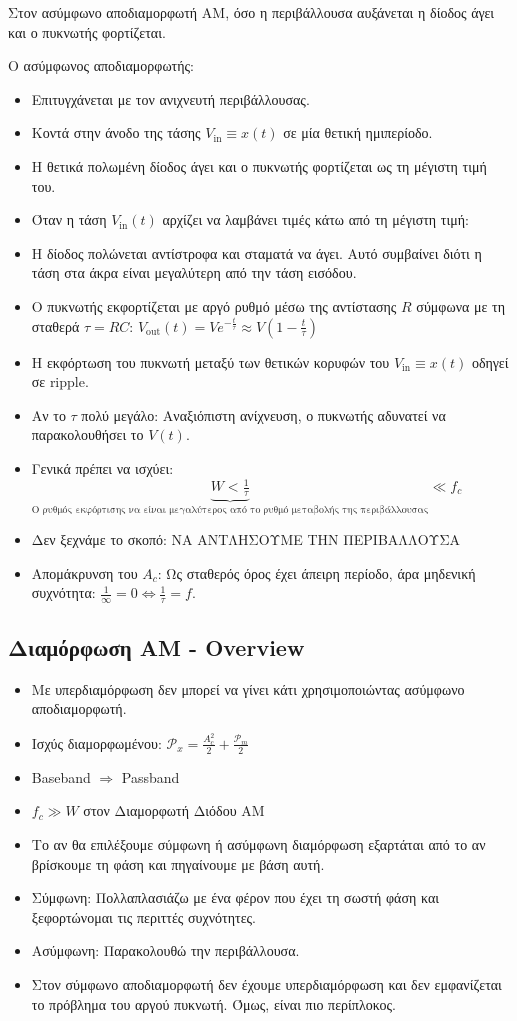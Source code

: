 \documentclass[a4paper,12pt]{article}
\begin{document}
Στον ασύμφωνο αποδιαμορφωτή AM, όσο η περιβάλλουσα αυξάνεται η δίοδος άγει και ο πυκνωτής φορτίζεται.

Ο ασύμφωνος αποδιαμορφωτής:
\begin{itemize}
\item Επιτυγχάνεται με τον ανιχνευτή περιβάλλουσας.
\item Κοντά στην άνοδο της τάσης \(V_{\text{in}} \equiv x(t)\) σε μία θετική ημιπερίοδο.
\item Η θετικά πολωμένη δίοδος άγει και ο πυκνωτής φορτίζεται ως τη μέγιστη τιμή του.
\item Όταν η τάση \(V_{\text{in}}(t)\) αρχίζει να λαμβάνει τιμές κάτω από τη μέγιστη τιμή:
\item Η δίοδος πολώνεται αντίστροφα και σταματά να άγει. Αυτό συμβαίνει διότι η τάση στα άκρα είναι μεγαλύτερη από την τάση εισόδου.
\item Ο πυκνωτής εκφορτίζεται με αργό ρυθμό μέσω της αντίστασης \(R\) σύμφωνα με τη σταθερά \(\tau=RC\): \(V_{\text{out}}(t)=Ve^{-\frac{t}{\tau}} \approx V(1-\frac{t}{\tau})\)
\item Η εκφόρτωση του πυκνωτή μεταξύ των θετικών κορυφών του \(V_{\text{in}} \equiv x(t)\) οδηγεί σε ripple.
\item Αν το \(\tau\) πολύ μεγάλο: Αναξιόπιστη ανίχνευση, ο πυκνωτής αδυνατεί να παρακολουθήσει το \(V(t)\).
\item Γενικά πρέπει να ισχύει: 
\(\underbrace{W<\frac{1}{\tau}}_{\text{Ο ρυθμός εκφόρτισης να είναι μεγαλύτερος από το ρυθμό μεταβολής της περιβάλλουσας}} \ll f_c\)
\item Δεν ξεχνάμε το σκοπό: ΝΑ ΑΝΤΛΗΣΟΥΜΕ ΤΗΝ ΠΕΡΙΒΑΛΛΟΥΣΑ
\item Απομάκρυνση του \(A_c\): Ως σταθερός όρος έχει άπειρη περίοδο, άρα μηδενική συχνότητα: \(\frac{1}{\infty}=0 \iff \frac{1}{\tau} = f\).
\end{itemize}

\subsection*{Διαμόρφωση AM - Overview}
\begin{itemize}
\item Με υπερδιαμόρφωση δεν μπορεί να γίνει κάτι χρησιμοποιώντας ασύμφωνο αποδιαμορφωτή.
\item Ισχύς διαμορφωμένου: \(\mathcal{P}_x=\frac{A_c^2}{2} + \frac{\mathcal{P}_m}{2}\)
\item Baseband \(\Rightarrow\) Passband
\item \(f_c \gg W\) στον Διαμορφωτή Διόδου ΑΜ
\item Το αν θα επιλέξουμε σύμφωνη ή ασύμφωνη διαμόρφωση εξαρτάται από το αν βρίσκουμε τη φάση και πηγαίνουμε με βάση αυτή.
\item Σύμφωνη: Πολλαπλασιάζω με ένα φέρον που έχει τη σωστή φάση και ξεφορτώνομαι τις περιττές συχνότητες.
\item Ασύμφωνη: Παρακολουθώ την περιβάλλουσα.
\item Στον σύμφωνο αποδιαμορφωτή δεν έχουμε υπερδιαμόρφωση και δεν εμφανίζεται το πρόβλημα του αργού πυκνωτή. Όμως, είναι πιο περίπλοκος.
\end{itemize}
\end{document}
